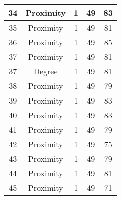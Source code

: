 \documentclass[results.tex]{subfiles}
\begin{document}
\begin{center}
\begin{tabular}{| c || c | c | c | c |}
            \hline
            34                      & Proximity                    & 1                      & 49                      & 83                   \\
            \hline
            35                      & Proximity                    & 1                      & 49                      & 81                   \\
            \hline
            36                      & Proximity                    & 1                      & 49                      & 85                   \\
            \hline
            37                      & Proximity                    & 1                      & 49                      & 81                   \\
            \hline
            37                      & Degree                       & 1                      & 49                      & 81                   \\
            \hline
            38                      & Proximity                    & 1                      & 49                      & 79                   \\
            \hline
            39                      & Proximity                    & 1                      & 49                      & 83                   \\
            \hline
            40                      & Proximity                    & 1                      & 49                      & 83                   \\
            \hline
            41                      & Proximity                    & 1                      & 49                      & 79                   \\
            \hline
            42                      & Proximity                    & 1                      & 49                      & 75                   \\
            \hline
            43                      & Proximity                    & 1                      & 49                      & 79                   \\
            \hline
            44                      & Proximity                    & 1                      & 49                      & 81                   \\
            \hline
            45                      & Proximity                    & 1                      & 49                      & 71                   \\

\end{tabular}
\end{center}
\end{document}
